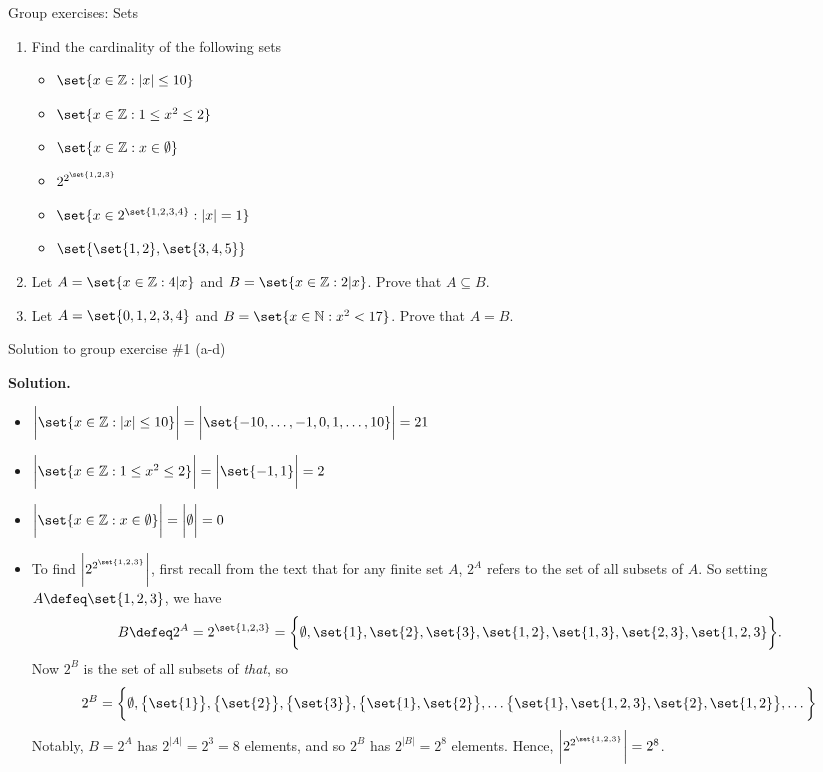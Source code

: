 \documentclass[10pt]{beamer}
\begin{document}
\begin{frame}{Group exercises: Sets}


\begin{enumerate}
\item Find the cardinality of the following sets
\begin{itemize}
\item[a)] $\set{x \in \mathbb{Z}: |x| \leq 10}$
\item[b)] $\set{x \in \mathbb{Z}: 1 \leq x^2 \leq 2}$
\item[c)] $\set{x \in \mathbb{Z}: x \in \emptyset}$
\item[d)] $2^{2^{\set{1,2,3}}}$
\item[e)] $\set{x \in 2^{\set{1,2,3,4}}: |x|=1}$
\item[f)] $\set{\set{1,2}, \set{3,4,5}}$
\end{itemize}
\item Let $A= \set{x \in \mathbb{Z}: 4|x}$ and  $B= \set{x \in \mathbb{Z}: 2|x}$.  Prove that $A \subseteq B$.
\item Let $A= \set{0,1,2,3,4}$ and  $B= \set{x \in \mathbb{N}: x^2<17}$.  Prove that $A=B$.
\end{enumerate}

\end{frame}



\begin{frame}{Solution to group exercise \#1 (a-d)}

\small 
\textbf{Solution.}

\begin{itemize}
\item[a)] $\bigg|\set{x \in \mathbb{Z}: |x| \leq 10}\bigg|=\bigg| \set{-10, \hdots, -1, 0, 1, \hdots, 10} \bigg| = 21$ \pause 
\item[b)] $\bigg|\set{x \in \mathbb{Z}: 1 \leq x^2 \leq 2}\bigg| = \bigg| \set{-1, 1} \bigg| = 2 $ \pause 
\item[c)] $\bigg| \set{x \in \mathbb{Z}: x \in \emptyset} \bigg| = \bigg| \emptyset \bigg| = 0 $ \pause 
\item[d)] To find $\bigg|2^{2^{\set{1,2,3}}}\bigg|$, first recall from the text that for any finite set $A$, $2^A$ refers to the set of all subsets of $A$. So setting $A \defeq \set{1,2,3}$, we have 
\[ B \defeq 2^A = 2^{\set{1,2,3}} = \bigg\{ \emptyset, \set{1}, \set{2}, \set{3}, \set{1,2}, \set{1,3}, \set{2,3}, \set{1,2,3} \bigg\}. \]
Now  $2^B$ is the set of all subsets of \textit{that}, 
so
\[2^B = \bigg\{ \emptyset,  \big\{ \set{1}  \big\}, \big\{ \set{2} \big\}, \big\{  \set{3} \big\} , \big\{  \set{1},\set{2} \big\}, \hdots  \big\{  \set{1}, \set{1,2,3}, \set{2}, \set{1,2} \big\} , \hdots \bigg\}  \]
Notably, $B=2^A$ has $2^{|A|} = 2^3=8$ elements, and so $2^B$ has $2^{|B|} = 2^8$ elements. Hence,  $\bigg|2^{2^{\set{1,2,3}}}\bigg| = 2^8$. 
\end{itemize}


\end{frame}
\end{document}
